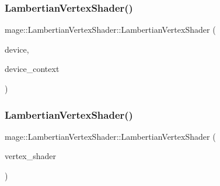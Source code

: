 \subsubsection{\texorpdfstring{Lambertian\+Vertex\+Shader()}{LambertianVertexShader()}\hspace{0.1cm}{\footnotesize\ttfamily [1/3]}}
{\footnotesize\ttfamily mage\+::\+Lambertian\+Vertex\+Shader\+::\+Lambertian\+Vertex\+Shader (\begin{DoxyParamCaption}\item[{I\+D3\+D11\+Device2 $\ast$}]{device,  }\item[{I\+D3\+D11\+Device\+Context2 $\ast$}]{device\+\_\+context }\end{DoxyParamCaption})\hspace{0.3cm}{\ttfamily [explicit]}}

\hypertarget{classmage_1_1_lambertian_vertex_shader_add164d66906e307d95232b2c41567a21}{}\label{classmage_1_1_lambertian_vertex_shader_add164d66906e307d95232b2c41567a21} 
\subsubsection{\texorpdfstring{Lambertian\+Vertex\+Shader()}{LambertianVertexShader()}\hspace{0.1cm}{\footnotesize\ttfamily [2/3]}}
{\footnotesize\ttfamily mage\+::\+Lambertian\+Vertex\+Shader\+::\+Lambertian\+Vertex\+Shader (\begin{DoxyParamCaption}\item[{const \hyperlink{classmage_1_1_lambertian_vertex_shader}{Lambertian\+Vertex\+Shader} \&}]{vertex\+\_\+shader }\end{DoxyParamCaption})\hspace{0.3cm}{\ttfamily [delete]}}

\hypertarget{classmage_1_1_lambertian_vertex_shader_afd8f8b77d0e54df2241fe5f3f54205f4}{}\label{classmage_1_1_lambertian_vertex_shader_afd8f8b77d0e54df2241fe5f3f54205f4} 
